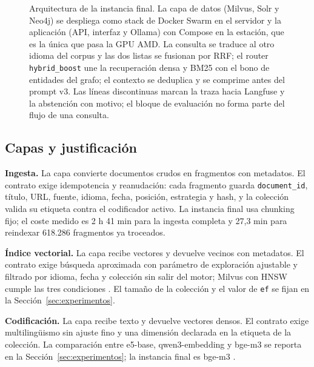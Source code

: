 \begin{figure}[t]
\caption{Arquitectura de la instancia final. La capa de datos (Milvus, Solr y Neo4j) se despliega como stack de Docker Swarm en el servidor y la aplicaci\'on (API, interfaz y Ollama) con Compose en la estaci\'on, que es la \'unica que pasa la GPU AMD. La consulta se traduce al otro idioma del corpus y las dos listas se fusionan por RRF; el router \texttt{hybrid\_boost} une la recuperaci\'on densa y BM25 con el bono de entidades del grafo; el contexto se deduplica y se comprime antes del prompt v3. Las l\'ineas discontinuas marcan la traza hacia Langfuse y la abstenci\'on con motivo; el bloque de evaluaci\'on no forma parte del flujo de una consulta.}
\label{fig:arquitectura}
\end{figure}

\subsection{Capas y justificaci\'on}

\textbf{Ingesta.} La capa convierte documentos crudos en fragmentos con metadatos. El contrato exige idempotencia y reanudaci\'on: cada fragmento guarda \texttt{document\_id}, t\'itulo, URL, fuente, idioma, fecha, posici\'on, estrategia y hash, y la colecci\'on valida su etiqueta contra el codificador activo. La instancia final usa chunking fijo; el coste medido es 2 h 41 min para la ingesta completa y 27,3 min para reindexar 618.286 fragmentos ya troceados.

\textbf{\'Indice vectorial.} La capa recibe vectores y devuelve vecinos con metadatos. El contrato exige b\'usqueda aproximada con par\'ametro de exploraci\'on ajustable y filtrado por idioma, fecha y colecci\'on sin salir del motor; Milvus con HNSW cumple las tres condiciones \cite{malkov2020hnsw}. El tama\~no de la colecci\'on y el valor de \texttt{ef} se fijan en la Secci\'on~\ref{sec:experimentos}.

\textbf{Codificaci\'on.} La capa recibe texto y devuelve vectores densos. El contrato exige multiling\"uismo sin ajuste fino y una dimensi\'on declarada en la etiqueta de la colecci\'on. La comparaci\'on entre e5-base, qwen3-embedding y bge-m3 se reporta en la Secci\'on~\ref{sec:experimentos}; la instancia final es bge-m3 \cite{chen2024bge}.

